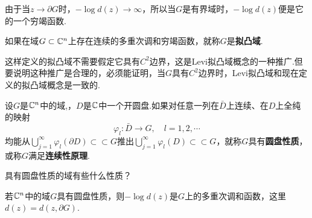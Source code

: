 由于当$z\to\partial G$时，$-\log d(z)\to\infty$，所以当$G$是有界域时，$-\log d(z)$便是它的一个穷竭函数.
\begin{definition}\label{def5.5.2}
	如果在域$G\subset\mathbb C^n$上存在连续的多重次调和穷竭函数，就称$G$是\textbf{拟凸域}.
\end{definition}
这样定义的拟凸域不需要假定它具有$C^2$边界，这是Levi拟凸域概念的一种推广.但要说明这种推广是合理的，必须能证明，当$G$具有$C^2$边界时，Levi拟凸域和现在定义的拟凸域概念是一致的.
\begin{definition}\label{def5.5.3}
	设$G$是$\mathbb C^n$中的域,，$D$是$\mathbb C$中一个开圆盘.如果对任意一列在$\bar{D}$上连续、在$D$上全纯的映射
	\[\varphi_l\colon \bar{D}\to G,\quad l=1,2,\cdots\]
	均能从$\bigcup_{j=1}^\infty \varphi_l(\partial D)\subset\subset G$推出$\bigcup_{j=1}^\infty\varphi_l(D)\subset\subset G$，就称$G$具有\textbf{圆盘性质}，或称$G$满足\textbf{连续性原理}.
\end{definition}
具有圆盘性质的域有些什么性质？
\begin{theorem}\label{thm5.5.4}
	若$\mathbb C^n$中的域$G$具有圆盘性质，则$-\log d(z)$是$G$上的多重次调和函数，这里$d(z)=d(z,\partial G)$.
\end{theorem}
